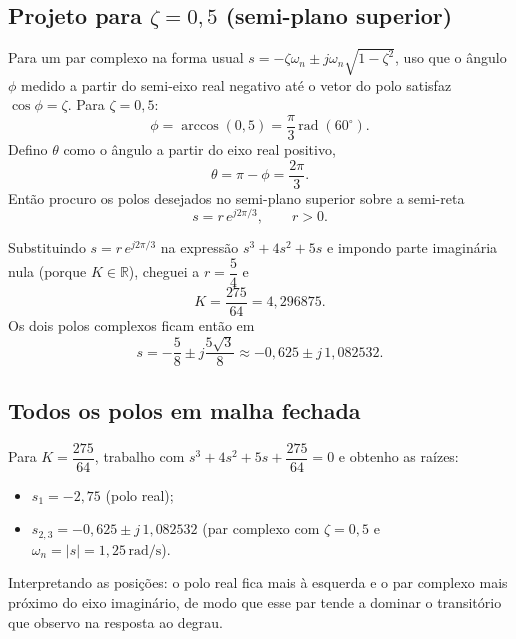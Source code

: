 \documentclass[11pt,a4paper]{article}
\begin{document}
\subsection*{Projeto para $\zeta=0{,}5$ (semi-plano superior)}

Para um par complexo na forma usual $s=-\zeta\omega_n \pm j\omega_n\sqrt{1-\zeta^2}$, uso que o ângulo $\phi$ medido a partir do semi-eixo real negativo até o vetor do polo satisfaz $\cos\phi=\zeta$. Para $\zeta=0{,}5$:
\begin{equation}
  \phi=\arccos(0{,}5)=\frac{\pi}{3}\,\mathrm{rad}\;(60^\circ).
\end{equation}
Defino $\theta$ como o ângulo a partir do eixo real positivo,
\begin{equation}
  \theta=\pi-\phi=\frac{2\pi}{3}.
\end{equation}
Então procuro os polos desejados no semi-plano superior sobre a semi-reta
\begin{equation}
  s=r\,e^{j2\pi/3},\qquad r>0 .
\end{equation}

Substituindo $s=r\,e^{j2\pi/3}$ na expressão $s^3+4s^2+5s$ e impondo parte imaginária nula (porque $K\in\mathbb{R}$), cheguei a $r=\dfrac{5}{4}$ e
\begin{equation}
  K=\frac{275}{64}=4{,}296875 .
\end{equation}
Os dois polos complexos ficam então em
\begin{equation}
  s=-\frac{5}{8}\pm j\frac{5\sqrt{3}}{8}
  \approx -0{,}625 \pm j\,1{,}082532 .
\end{equation}

\subsection*{Todos os polos em malha fechada}

Para $K=\dfrac{275}{64}$, trabalho com $s^3+4s^2+5s+\dfrac{275}{64}=0$ e obtenho as raízes:
\begin{itemize}
  \item $s_1=-2{,}75$ (polo real);
  \item $s_{2,3}=-0{,}625 \pm j\,1{,}082532$ (par complexo com $\zeta=0{,}5$ e $\omega_n=|s|=1{,}25\,\mathrm{rad/s}$).
\end{itemize}

Interpretando as posições: o polo real fica mais à esquerda e o par complexo mais próximo do eixo imaginário, de modo que esse par tende a dominar o transitório que observo na resposta ao degrau.
\end{document}

